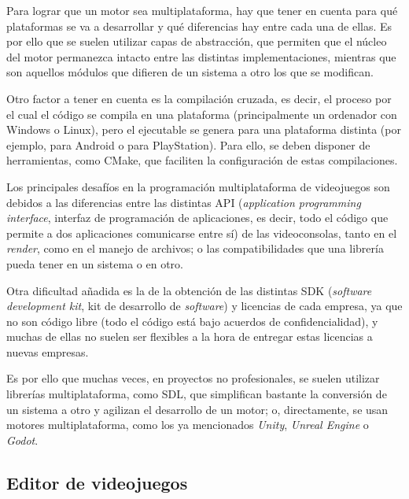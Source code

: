 \medskip

Para lograr que un motor sea multiplataforma, hay que tener en cuenta para qué plataformas se va a desarrollar y qué diferencias hay entre cada una de ellas. Es por ello que se suelen utilizar capas de abstracción, que permiten que el núcleo del motor permanezca intacto entre las distintas implementaciones, mientras que son aquellos módulos que difieren de un sistema a otro los que se modifican.

\smallskip

Otro factor a tener en cuenta es la compilación cruzada, es decir, el proceso por el cual el código se compila en una plataforma (principalmente un ordenador con Windows o Linux), pero el ejecutable se genera para una plataforma distinta (por ejemplo, para Android o para PlayStation). Para ello, se deben disponer de herramientas, como CMake, que faciliten la configuración de estas compilaciones.

\medskip

Los principales desafíos en la programación multiplataforma de videojuegos son debidos a las diferencias entre las distintas API (\textit{application programming interface}, interfaz de programación de aplicaciones, es decir, todo el código que permite a dos aplicaciones comunicarse entre sí) de las videoconsolas, tanto en el \textit{render}, como en el manejo de archivos; o las compatibilidades que una librería pueda tener en un sistema o en otro.

\medskip

Otra dificultad añadida es la de la obtención de las distintas SDK (\textit{software development kit}, kit de desarrollo de \textit{software}) y licencias de cada empresa, ya que no son código libre (todo el código está bajo acuerdos de confidencialidad), y muchas de ellas no suelen ser flexibles a la hora de entregar estas licencias a nuevas empresas.

\medskip

Es por ello que muchas veces, en proyectos no profesionales, se suelen utilizar librerías multiplataforma, como SDL, que simplifican bastante la conversión de un sistema a otro y agilizan el desarrollo de un motor; o, directamente, se usan motores multiplataforma, como los ya mencionados \textit{Unity}, \textit{Unreal Engine} o \textit{Godot}.

\subsection{Editor de videojuegos}

